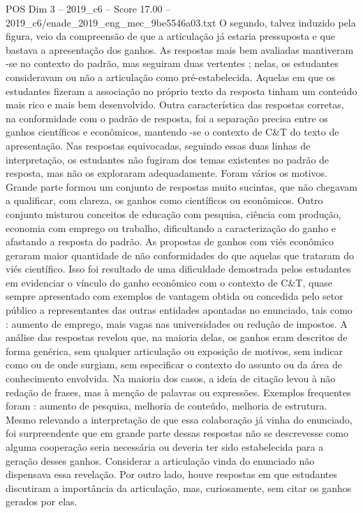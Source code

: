 \begin{textsample}{POS Dim 3 – 2019\_c6 – Score 17.00 – 2019\_c6/enade\_2019\_eng\_mec\_9be5546a03.txt}
O segundo, talvez induzido pela figura, veio da compreensão de que a articulação já estaria pressuposta e que bastava a apresentação dos ganhos.
As respostas mais bem avaliadas mantiveram -se no contexto do padrão, mas seguiram duas vertentes ; nelas, os estudantes consideravam ou não a articulação como pré-estabelecida.
Aquelas em que os estudantes fizeram a associação no próprio texto da resposta tinham um conteúdo mais rico e mais bem desenvolvido.
Outra característica das respostas corretas, na conformidade com o padrão de resposta, foi a separação precisa entre os ganhos científicos e econômicos, mantendo -se o contexto de C\&T do texto de apresentação.
Nas respostas equivocadas, seguindo essas duas linhas de interpretação, os estudantes não fugiram dos temas existentes no padrão de resposta, mas não os exploraram adequadamente.
Foram vários os motivos.
Grande parte formou um conjunto de respostas muito sucintas, que não chegavam a qualificar, com clareza, os ganhos como científicos ou econômicos.
Outro conjunto misturou conceitos de educação com pesquisa, ciência com produção, economia com emprego ou trabalho, dificultando a caracterização do ganho e afastando a resposta do padrão.
As propostas de ganhos com viés econômico geraram maior quantidade de não conformidades do que aquelas que trataram do viés científico.
Isso foi resultado de uma dificuldade demostrada pelos estudantes em evidenciar o vínculo do ganho econômico com o contexto de C\&T, quase sempre apresentado com exemplos de vantagem obtida ou concedida pelo setor público a representantes das outras entidades apontadas no enunciado, tais como : aumento de emprego, mais vagas nas universidades ou redução de impostos.
A análise das respostas revelou que, na maioria delas, os ganhos eram descritos de forma genérica, sem qualquer articulação ou exposição de motivos, sem indicar como ou de onde surgiam, sem especificar o contexto do assunto ou da área de conhecimento envolvida.
Na maioria dos casos, a ideia de citação levou à não redação de frases, mas à menção de palavras ou expressões.
Exemplos frequentes foram : aumento de pesquisa, melhoria de conteúdo, melhoria de estrutura.
Mesmo relevando a interpretação de que essa colaboração já vinha do enunciado, foi surpreendente que em grande parte dessas respostas não se descrevesse como alguma cooperação seria necessária ou deveria ter sido estabelecida para a geração desses ganhos.
Considerar a articulação vinda do enunciado não dispensava essa revelação.
Por outro lado, houve respostas em que estudantes discutiram a importância da articulação, mas, curiosamente, sem citar os ganhos gerados por elas.

\end{textsample}
